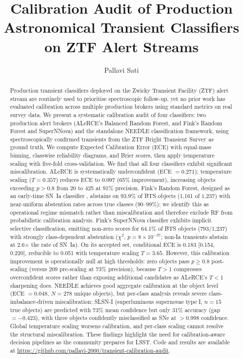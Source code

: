 \documentclass[twocolumn]{aastex631}
\begin{document}
\title{Calibration Audit of Production Astronomical Transient Classifiers on ZTF Alert Streams}

\author{Pallavi Sati}

\begin{abstract}
Production transient classifiers deployed on the Zwicky Transient Facility (ZTF) alert stream are routinely used to prioritise spectroscopic follow-up, yet no prior work has evaluated calibration across multiple production brokers using standard metrics on real survey data. We present a systematic calibration audit of four classifiers: two production alert brokers (ALeRCE's Balanced Random Forest, and Fink's Random Forest and SuperNNova) and the standalone NEEDLE classification framework, using spectroscopically confirmed transients from the ZTF Bright Transient Survey as ground truth. We compute Expected Calibration Error (ECE) with equal-mass binning, classwise reliability diagrams, and Brier scores, then apply temperature scaling with five-fold cross-validation. We find that all four classifiers exhibit significant miscalibration. ALeRCE is systematically underconfident (ECE $= 0.271$); temperature scaling ($T = 0.357$) reduces ECE to $0.097$ (65\% improvement), increasing objects exceeding $p > 0.8$ from 20 to 425 at 91\% precision. Fink's Random Forest, designed as an early-time SN~Ia classifier \citep{leoni2022}, abstains on 93.9\% of BTS objects (1,161 of 1,237) with near-uniform abstention rates across true classes (90--99\%); we identify this as operational regime mismatch rather than miscalibration and therefore exclude RF from probabilistic calibration analysis. Fink's SuperNNova classifier exhibits implicit selective classification, emitting non-zero scores for 64.1\% of BTS objects (793/1,237) with strongly class-dependent abstention ($\chi^2$, $p = 8 \times 10^{-37}$; non-Ia transients abstain at 2.6$\times$ the rate of SN~Ia). On its accepted set, conditional ECE is 0.183 [0.154, 0.220], reducible to 0.051 with temperature scaling $T = 3.65$. However, this calibration improvement is operationally null at high thresholds: zero objects pass $p \ge 0.8$ post-scaling (versus 209 pre-scaling at 73\% precision), because $T > 1$ compresses overconfident scores rather than exposing additional candidates as ALeRCE's $T < 1$ sharpening does. NEEDLE achieves good aggregate calibration at the object level (ECE $= 0.048$, $N = 278$ unique objects), but per-class analysis reveals severe class-imbalance-driven miscalibration: SLSN-I (superluminous supernovae type I, $n = 15$ true objects) are predicted with 73\% mean confidence but only 31\% accuracy (gap $= -0.423$), with three objects confidently misclassified as SNe at $> 0.998$ confidence. Global temperature scaling worsens calibration, and per-class scaling cannot resolve the structural miscalibration. These findings highlight the need for calibration-aware decision pipelines as the community prepares for LSST. Code and results are available at \url{https://github.com/pallavi-2000/transient-calibration-audit}.
\end{abstract}
\end{document}
